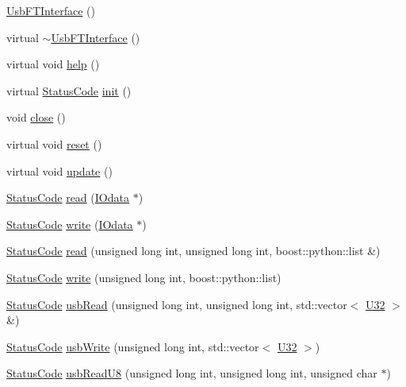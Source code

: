 \begin{DoxyCompactItemize}
\item 
\hyperlink{classUsbFTInterface_aa0f871007821694c3e1f53f65cea8af4}{Usb\+F\+T\+Interface} ()
\item 
virtual \hyperlink{classUsbFTInterface_ad1fb563d0ff5f76aa833d02e65d4204a}{$\sim$\+Usb\+F\+T\+Interface} ()
\item 
virtual void \hyperlink{classUsbFTInterface_a91a0046390c76ca8abaa330fa244279c}{help} ()
\item 
virtual \hyperlink{classStatusCode}{Status\+Code} \hyperlink{classUsbFTInterface_a5371fe7b447850599eaec81a0ffa2ba0}{init} ()
\item 
void \hyperlink{classUsbFTInterface_ad555e20eb4b80da1d3cac5a8c6509bb5}{close} ()
\item 
virtual void \hyperlink{classUsbFTInterface_a7bd95c22da69daeaad7f752f560740f4}{reset} ()
\item 
virtual void \hyperlink{classUsbFTInterface_a6adc58a50696c9b3268e84c291901ce7}{update} ()
\item 
\hyperlink{classStatusCode}{Status\+Code} \hyperlink{classUsbFTInterface_ab9daafce1d7878b95ba0655a570922e2}{read} (\hyperlink{classIOdata}{I\+Odata} $\ast$)
\item 
\hyperlink{classStatusCode}{Status\+Code} \hyperlink{classUsbFTInterface_a059296c0d7e5118f975f1dfa2e1f3fbb}{write} (\hyperlink{classIOdata}{I\+Odata} $\ast$)
\item 
\hyperlink{classStatusCode}{Status\+Code} \hyperlink{classUsbFTInterface_a682e63cb6168be314aa3cc6e6a10ec59}{read} (unsigned long int, unsigned long int, boost\+::python\+::list \&)
\item 
\hyperlink{classStatusCode}{Status\+Code} \hyperlink{classUsbFTInterface_a2efbde3a31cdbe44a3cbd66da6592870}{write} (unsigned long int, boost\+::python\+::list)
\item 
\hyperlink{classStatusCode}{Status\+Code} \hyperlink{classUsbFTInterface_adb38dfafa3946dd373585e596851b6e6}{usb\+Read} (unsigned long int, unsigned long int, std\+::vector$<$ \hyperlink{classUsbFTInterface_aee2201fe4d977aa03568fa8dbacc39ba}{U32} $>$ \&)
\item 
\hyperlink{classStatusCode}{Status\+Code} \hyperlink{classUsbFTInterface_ab7bf021f1fa3af385234e639c84827ef}{usb\+Write} (unsigned long int, std\+::vector$<$ \hyperlink{classUsbFTInterface_aee2201fe4d977aa03568fa8dbacc39ba}{U32} $>$)
\item 
\hyperlink{classStatusCode}{Status\+Code} \hyperlink{classUsbFTInterface_ab0803dd4c3ce3bf26dff4f4145b34546}{usb\+Read\+U8} (unsigned long int, unsigned long int, unsigned char $\ast$)

\end{DoxyCompactItemize}
